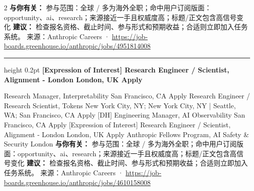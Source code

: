 \documentclass[10.5pt]{ctexart}
\begin{document}
\begin{multicols}{2}
\textbf{与你有关：} 参与范围：全球 / 多为海外全职；命中用户订阅版面：opportunity、ai、research；来源接近一手且权威度高；标题/正文包含高信号变化
\textbf{建议：} 检查报名资格、截止时间、参与形式和预期收益；合适则立即加入任务系统。
{\footnotesize\color{ormuted} 来源：Anthropic Careers · \url{https://job-boards.greenhouse.io/anthropic/jobs/4951814008}}
\vspace{2mm}
\hrule height 0.2pt
\vspace{2mm}
{\large\bfseries [Expression of Interest] Research Engineer / Scientist, Alignment - London London, UK Apply}\par
[Expression of Interest] Research Manager, Interpretability San Francisco, CA Apply Research Engineer / Research Scientist, Tokens New York City, NY; New York City, NY | Seattle, WA; San Francisco, CA Apply [DH] Engineering Manager, AI Observability San Francisco, CA Apply [Expression of Interest] Research Engineer / Scientist, Alignment - London London, UK Apply Anthropic Fellows Program, AI Safety \& Security London
\textbf{与你有关：} 参与范围：全球 / 多为海外全职；命中用户订阅版面：opportunity、ai、research；来源接近一手且权威度高；标题/正文包含高信号变化
\textbf{建议：} 检查报名资格、截止时间、参与形式和预期收益；合适则立即加入任务系统。
{\footnotesize\color{ormuted} 来源：Anthropic Careers · \url{https://job-boards.greenhouse.io/anthropic/jobs/4610158008}}
\end{multicols}
\end{document}
